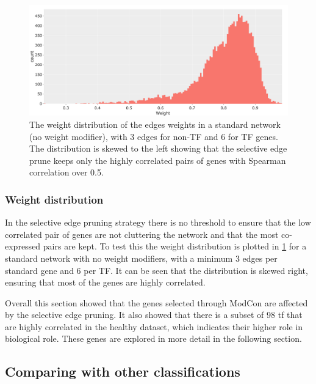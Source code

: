 \begin{figure}[!b]   
\centering
\includegraphics[width=1.0\textwidth,height=1.0\textheight,keepaspectratio]{Sections/Network_I/Resources/selective_pruning/weight_distrib.png}
  \caption[Weight distribution]{The weight distribution of the edges weights in a standard network (no weight modifier), with 3 edges for non-TF and 6 for TF genes. The distribution is skewed to the left showing that the selective edge prune keeps only the highly correlated pairs of genes with Spearman correlation over 0.5. }
\label{fig:N_I:weight_distrib}
\end{figure}

\subsubsection*{Weight distribution}

In the selective edge pruning strategy there is no threshold to ensure that the low correlated pair of genes are not cluttering the network and that the most co-expressed pairs are kept. To test this the weight distribution is plotted in \cref{fig:N_I:weight_distrib} for a standard network with no weight modifiers, with a minimum 3 edges per standard gene and 6 per TF. It can be seen that the distribution is skewed right, ensuring that most of the genes are highly correlated.


Overall this section showed that the genes selected through ModCon are affected by the selective edge pruning. It also showed that there is a subset of 98 \acrlong{tf} that are highly correlated in the healthy dataset, which indicates their higher role in biological role. These genes are explored in more detail in the following section.


\subsection{Comparing with other classifications} \label{s:N_I:sel_tfs_mibc}

